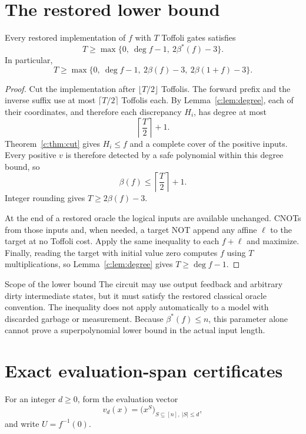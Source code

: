 \section{The restored lower bound}
\begin{theorem}\label{c:thm:complete-bound}
Every restored implementation of $f$ with $T$ Toffoli gates satisfies
\begin{equation}\label{c:eq:complete-bound}
 T\ge\max\{0,\ \deg f-1,\ 2\beta^*(f)-3\}.
\end{equation}
In particular,
\[
 T\ge\max\{0,\ \deg f-1,\ 2\beta(f)-3,\ 2\beta(1+f)-3\}.
\]
\end{theorem}
\begin{proof}
Cut the implementation after $\lfloor T/2\rfloor$ Toffolis. The forward prefix and the inverse suffix use at most $\lceil T/2\rceil$ Toffolis each. By Lemma~\ref{c:lem:degree}, each of their coordinates, and therefore each discrepancy $H_i$, has degree at most
\[
 \left\lceil\frac T2\right\rceil+1.
\]
Theorem~\ref{c:thm:cut} gives $H_i\le f$ and a complete cover of the positive inputs. Every positive $v$ is therefore detected by a safe polynomial within this degree bound, so
\[
 \beta(f)\le\left\lceil\frac T2\right\rceil+1.
\]
Integer rounding gives $T\ge2\beta(f)-3$.

At the end of a restored oracle the logical inputs are available unchanged. CNOTs from those inputs and, when needed, a target NOT append any affine $\ell$ to the target at no Toffoli cost. Apply the same inequality to each $f+\ell$ and maximize. Finally, reading the target with initial value zero computes $f$ using $T$ multiplications, so Lemma~\ref{c:lem:degree} gives $T\ge\deg f-1$.
\end{proof}

\begin{circuitscopebox}{Scope of the lower bound}
The circuit may use output feedback and arbitrary dirty intermediate states, but it must satisfy the restored classical oracle convention. The inequality does not apply automatically to a model with discarded garbage or measurement. Because $\beta^*(f)\le n$, this parameter alone cannot prove a superpolynomial lower bound in the actual input length.
\end{circuitscopebox}

\section{Exact evaluation-span certificates}
For an integer $d\ge0$, form the evaluation vector
\[
 v_d(x)=\bigl(x^S\bigr)_{S\subseteq[n],\ |S|\le d},
\]
and write $U=f^{-1}(0)$.

